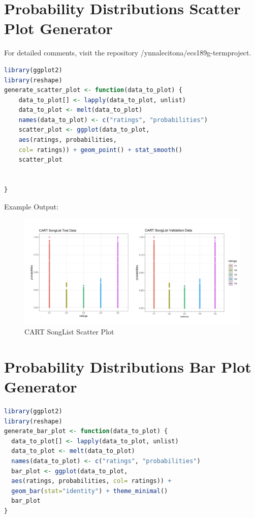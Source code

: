 \documentclass{article}
\begin{document}
\newpage
\section{Probability Distributions Scatter Plot Generator}
For detailed comments, visit the repository
/ynnalecitona/ecs189g-termproject.
\begin{lstlisting}[language=R]
library(ggplot2)
library(reshape)
generate_scatter_plot <- function(data_to_plot) {
    data_to_plot[] <- lapply(data_to_plot, unlist)
    data_to_plot <- melt(data_to_plot)
    names(data_to_plot) <- c("ratings", "probabilities")
    scatter_plot <- ggplot(data_to_plot, 
    aes(ratings, probabilities, 
    col= ratings)) + geom_point() + stat_smooth()
    scatter_plot
    
    
}
\end{lstlisting}

Example Output:
\begin{figure}[ht]
\centering
\includegraphics[scale=0.3]{CART SongList Scatter Plot.png}
\caption{CART SongList Scatter Plot}
\label{fig:universe}
\end{figure}


\section{Probability Distributions Bar Plot Generator}
\begin{lstlisting}[language = R]
library(ggplot2)
library(reshape)
generate_bar_plot <- function(data_to_plot) {
  data_to_plot[] <- lapply(data_to_plot, unlist)
  data_to_plot <- melt(data_to_plot)
  names(data_to_plot) <- c("ratings", "probabilities")
  bar_plot <- ggplot(data_to_plot, 
  aes(ratings, probabilities, col= ratings)) + 
  geom_bar(stat="identity") + theme_minimal()
  bar_plot
}
\end{lstlisting}
\end{document}
